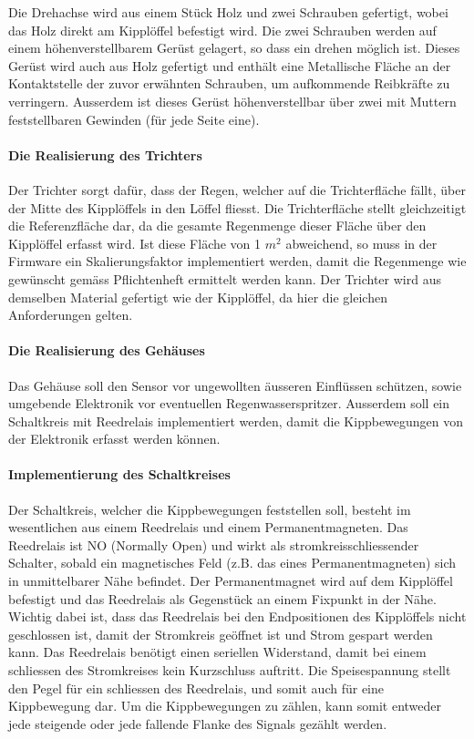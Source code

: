 Die Drehachse wird aus einem Stück Holz und zwei Schrauben gefertigt, wobei das Holz direkt am Kipplöffel befestigt wird. Die zwei Schrauben werden auf einem höhenverstellbarem Gerüst gelagert, so dass ein drehen möglich ist. Dieses Gerüst wird auch aus Holz gefertigt und enthält eine Metallische Fläche an der Kontaktstelle der zuvor erwähnten Schrauben, um aufkommende Reibkräfte zu verringern. Ausserdem ist dieses Gerüst höhenverstellbar über zwei mit Muttern feststellbaren Gewinden (für jede Seite eine). 

\paragraph{Die Realisierung des Trichters}
Der Trichter sorgt dafür, dass der Regen, welcher auf die Trichterfläche fällt, über der Mitte des Kipplöffels in den Löffel fliesst. Die Trichterfläche stellt gleichzeitigt die Referenzfläche dar, da die gesamte Regenmenge dieser Fläche über den Kipplöffel erfasst wird. Ist diese Fläche von 1 $m^2$ abweichend, so muss in der Firmware ein Skalierungsfaktor implementiert werden, damit die Regenmenge wie gewünscht gemäss Pflichtenheft ermittelt werden kann. Der Trichter wird aus demselben Material gefertigt wie der Kipplöffel, da hier die gleichen Anforderungen gelten.

\paragraph{Die Realisierung des Gehäuses}
Das Gehäuse soll den Sensor vor ungewollten äusseren Einflüssen schützen, sowie umgebende Elektronik vor eventuellen Regenwasserspritzer. Ausserdem soll ein Schaltkreis mit Reedrelais implementiert werden, damit die Kippbewegungen von der Elektronik erfasst werden können.

\paragraph{Implementierung des Schaltkreises}
Der Schaltkreis, welcher die Kippbewegungen feststellen soll, besteht im wesentlichen aus einem Reedrelais und einem Permanentmagneten. Das Reedrelais ist NO (Normally Open) und wirkt als stromkreisschliessender Schalter, sobald ein magnetisches Feld (z.B. das eines Permanentmagneten) sich in unmittelbarer Nähe befindet. Der Permanentmagnet wird auf dem Kipplöffel befestigt und das Reedrelais als Gegenstück an einem Fixpunkt in der Nähe. Wichtig dabei ist, dass das Reedrelais bei den Endpositionen des Kipplöffels nicht geschlossen ist, damit der Stromkreis geöffnet ist und Strom gespart werden kann. Das Reedrelais benötigt einen seriellen Widerstand, damit bei einem schliessen des Stromkreises kein Kurzschluss auftritt. Die Speisespannung stellt den Pegel für ein schliessen des Reedrelais, und somit auch für eine Kippbewegung dar. Um die Kippbewegungen zu zählen, kann somit entweder jede steigende oder jede fallende Flanke des Signals gezählt werden.  
